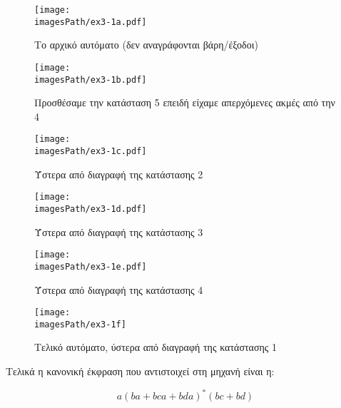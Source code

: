 \documentclass[12pt,a4paper]{article}
\newcommand{\imagesPath}{/home/nick/shmmy/8th/slp/slp-ntua/set1}
\begin{document}
			\begin{figure}[H]
				\begin{center}
					\texttt{[image: \\imagesPath/ex3-1a.pdf]}
					\caption{Το αρχικό αυτόματο (δεν αναγράφονται βάρη/έξοδοι)}
				\end{center}
			\end{figure}
			
			\begin{figure}[H]
				\begin{center}
					\texttt{[image: \\imagesPath/ex3-1b.pdf]}
					\caption{Προσθέσαμε την κατάσταση 5 επειδή είχαμε απερχόμενες ακμές από την 4}
				\end{center}
			\end{figure}

			\begin{figure}[H]
				\begin{center}
					\texttt{[image: \\imagesPath/ex3-1c.pdf]}
					\caption{Ύστερα από διαγραφή της κατάστασης 2}
				\end{center}
			\end{figure}

			\begin{figure}[H]
				\begin{center}
					\texttt{[image: \\imagesPath/ex3-1d.pdf]}
					\caption{Ύστερα από διαγραφή της κατάστασης 3}
				\end{center}
			\end{figure}

			\begin{figure}[H]
				\begin{center}
					\texttt{[image: \\imagesPath/ex3-1e.pdf]}
					\caption{Ύστερα από διαγραφή της κατάστασης 4}
				\end{center}
			\end{figure}

			\begin{figure}[H]
				\begin{center}
					\texttt{[image: \\imagesPath/ex3-1f]}
					\caption{Τελικό αυτόματο, ύστερα από διαγραφή της κατάστασης 1}
				\end{center}
			\end{figure}
			
			Τελικά η κανονική έκφραση που αντιστοιχεί στη μηχανή είναι η:
			
			\[
				a(ba + bca + bda)^*(bc+bd)
			\]
			
\end{document}
